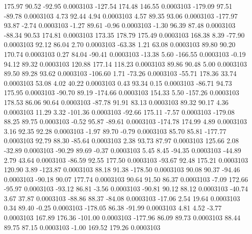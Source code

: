       175.97       90.52      -92.95     0.0003103
     -127.54      174.48      146.55     0.0003103
     -179.09       97.51      -89.78     0.0003103
        4.73       92.44        4.94     0.0003103
        4.57       89.35       93.06     0.0003103
     -177.97       93.87       -2.74     0.0003103
       -1.27       89.61       -0.96     0.0003103
       -1.30       96.39       87.48     0.0003103
      -88.34       90.53      174.81     0.0003103
      173.35      178.79      175.49     0.0003103
      168.38        8.39      -77.90     0.0003103
       92.12       86.04        2.70     0.0003103
      -63.38        1.21       63.08     0.0003103
       89.80       90.20      170.74     0.0003103
        0.27       84.04      -90.41     0.0003103
      -13.38        5.60     -166.55     0.0003103
       -0.19       94.12       89.32     0.0003103
      120.88      177.14      118.23     0.0003103
       89.86       90.48        5.00     0.0003103
       89.50       89.28       93.62     0.0003103
     -106.60        1.71      -73.26     0.0003103
      -55.71      178.36       33.74     0.0003103
       53.08        4.02       40.22     0.0003103
        0.43       93.34        0.15     0.0003103
      -86.71       94.73      175.95     0.0003103
      -90.70       89.19     -174.66     0.0003103
      154.33        5.50     -157.26     0.0003103
      178.53       86.06       90.64     0.0003103
      -87.78       91.91       83.13     0.0003103
       89.32       90.17        4.36     0.0003103
       11.29        3.32     -101.36     0.0003103
      -92.66      175.11       -7.57     0.0003103
     -179.08       88.25       89.75     0.0003103
       -0.52       95.87      -89.61     0.0003103
     -174.78      174.99        4.89     0.0003103
        3.16       92.35       92.28     0.0003103
       -1.97       89.70       -0.79     0.0003103
       85.70       85.81     -177.77     0.0003103
       92.79       88.30      -85.64     0.0003103
        2.38       93.73       87.97     0.0003103
      125.66        2.08      -32.89     0.0003103
      -90.29       89.69       -0.37     0.0003103
        5.45        8.45      -94.35     0.0003103
      -44.89        2.79       43.64     0.0003103
      -86.59       92.55      177.50     0.0003103
      -93.67       92.48      175.21     0.0003103
      120.90        3.89     -123.87     0.0003103
       88.18       91.38     -178.50     0.0003103
       90.08       90.37      -94.46     0.0003103
      -90.18       90.07      177.74     0.0003103
       90.64       91.50       86.37     0.0003103
       -7.09      172.66      -95.97     0.0003103
      -93.12       86.81       -3.56     0.0003103
      -90.81       90.12       88.12     0.0003103
      -40.74        3.67       37.87     0.0003103
      -88.86       88.37      -84.08     0.0003103
      -17.06        2.54       19.64     0.0003103
        0.34       89.40       -0.25     0.0003103
     -178.05       86.38      -91.99     0.0003103
        4.81        4.52       -3.77     0.0003103
      167.89      176.36     -101.00     0.0003103
     -177.96       86.09       89.73     0.0003103
       88.44       89.75       87.15     0.0003103
       -1.00      169.52      179.26     0.0003103
